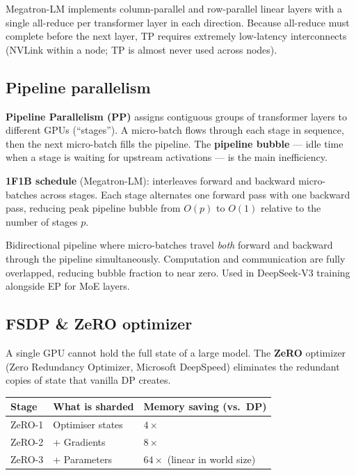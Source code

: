 Megatron-LM implements column-parallel and row-parallel linear layers with a single
all-reduce per transformer layer in each direction. Because all-reduce must complete
before the next layer, TP requires extremely low-latency interconnects (NVLink within
a node; TP is almost never used across nodes).

\subsection{Pipeline parallelism}

\textbf{Pipeline Parallelism (PP)} assigns contiguous groups of transformer layers to
different GPUs (``stages''). A micro-batch flows through each stage in sequence, then
the next micro-batch fills the pipeline. The \textbf{pipeline bubble} --- idle time
when a stage is waiting for upstream activations --- is the main inefficiency.

\textbf{1F1B schedule} (Megatron-LM): interleaves forward and backward micro-batches
across stages. Each stage alternates one forward pass with one backward pass, reducing
peak pipeline bubble from $O(p)$ to $O(1)$ relative to the number of stages $p$.

\begin{paperbox}[title={DualPipe (DeepSeek-V3, 2025)}]
  Bidirectional pipeline where micro-batches travel \emph{both} forward and backward
  through the pipeline simultaneously. Computation and communication are fully
  overlapped, reducing bubble fraction to near zero. Used in DeepSeek-V3 training
  alongside EP for MoE layers.
\end{paperbox}

\subsection{FSDP \& ZeRO optimizer}\label{sub:fsdp}

A single GPU cannot hold the full state of a large model. The \textbf{ZeRO} optimizer
(Zero Redundancy Optimizer, Microsoft DeepSpeed) eliminates the redundant copies of
state that vanilla DP creates.

\begin{center}
\begin{tabular}{lll}
\toprule
\textbf{Stage} & \textbf{What is sharded} & \textbf{Memory saving (vs.\ DP)} \\
\midrule
ZeRO-1 & Optimiser states & $4\times$ \\
ZeRO-2 & + Gradients & $8\times$ \\
ZeRO-3 & + Parameters & $64\times$ (linear in world size) \\
\bottomrule
\end{tabular}
\end{center}

